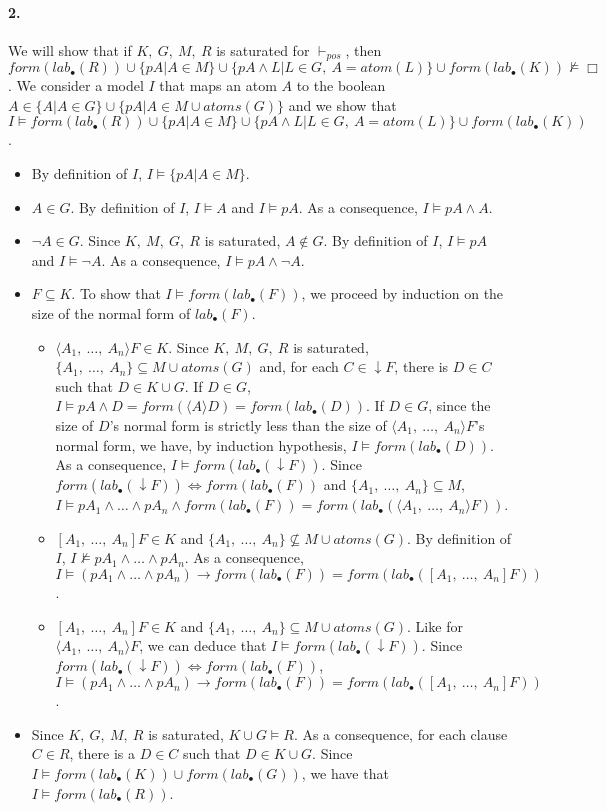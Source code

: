 \documentclass[a4paper,10pt]{article}
\newcommand{\atoms}{\mathit{atoms}}
\newcommand{\atom}{\mathit{atom}}
\newcommand{\pos}{\vdash_\mathit{pos}}
\newcommand{\F}{\mathit{form}}
\newcommand{\T}{\mathit{lab}}
\begin{document}
\paragraph{2.}
We will show that if $K,\ G,\ M,\ R$ is saturated for $\pos$, then
$\F(\T_\bullet(R))\cup\{pA|A\in M\}\cup\{pA\wedge L|L\in G,\ A=\atom(L)\}\cup
\F(\T_\bullet(K))\nvDash\Box$.
We consider a model $I$ that maps an atom $A$ to the boolean
$A\in\{A|A\in G\}\cup\{pA|A\in M\cup\atoms(G)\}$
and we show that $I\vDash\F(\T_\bullet(R))\cup\{pA|A\in M\}\cup\{pA\wedge L|L\in G,\ A=\atom(L)\}\cup
\F(\T_\bullet(K))$.
\begin{itemize}
 \item By definition of $I$, $I\vDash\{pA|A\in M\}$.
 \item $A\in G$. By definition of $I$, $I\vDash A$ and $I\vDash pA$. As a consequence, 
$I\vDash pA\wedge A$.
 \item $\neg A\in G$. Since $K,\ M,\ G,\ R$ is saturated, $A\notin G$. By definition of $I$,
$I\vDash pA$ and $I\vDash\neg A$. As a consequence, $I\vDash pA\wedge\neg A$.
 \item $F\subseteq K$. To show that $I\vDash\F(\T_\bullet(F))$, we proceed by induction on
the size of the normal form of $\T_\bullet(F)$.
\begin{itemize}
 \item $\langle A_1,\ \dots,\ A_n\rangle F\in K$. Since $K,\ M,\ G,\ R$ is saturated,
$\{A_1,\ \dots,\ A_n\}\subseteq M\cup\atoms(G)$ and, for each $C\in\downarrow F$, there is $D\in C$
such that $D\in K\cup G$. If $D\in G$, $I\vDash pA\wedge D=\F(\langle A\rangle D)=\F(\T_\bullet(D))$.
If $D\in G$, since the size of $D$'s normal form is strictly less than the size of
$\langle A_1,\ \dots,\ A_n\rangle F$'s normal form, we have, by induction hypothesis, 
$I\vDash\F(\T_\bullet(D))$. As a consequence, $I\vDash \F(\T_\bullet(\downarrow F))$.
Since $\F(\T_\bullet(\downarrow F))\Leftrightarrow\F(\T_\bullet(F))$ and 
$\{A_1,\ \dots,\ A_n\}\subseteq M$, $I\vDash pA_1\wedge\dots\wedge pA_n\wedge\F(\T_\bullet(F))=
\F(\T_\bullet(\langle A_1,\ \dots,\ A_n\rangle F))$.
 \item $[A_1,\ \dots,\ A_n]F\in K$ and $\{A_1,\ \dots,\ A_n\}\nsubseteq M\cup\atoms(G)$. 
By definition of $I$, $I\nvDash pA_1\wedge\dots\wedge pA_n$. As a consequence, $I\vDash(pA_1\wedge\dots\wedge pA_n)\rightarrow \F(\T_\bullet(F))=\F(\T_\bullet([A_1,\ \dots,\ A_n]F))$.
 \item $[A_1,\ \dots,\ A_n]F\in K$ and $\{A_1,\ \dots,\ A_n\}\subseteq M\cup\atoms(G)$.
Like for $\langle A_1,\ \dots,\ A_n\rangle F$, we can deduce that
$I\vDash\F(\T_\bullet(\downarrow F))$.
Since $\F(\T_\bullet(\downarrow F))\Leftrightarrow\F(\T_\bullet(F))$,
$I\vDash(pA_1\wedge\dots\wedge pA_n)\rightarrow \F(\T_\bullet(F))=\F(\T_\bullet([A_1,\ \dots,\ A_n]F))$.
\end{itemize}
\item Since $K,\ G,\ M,\ R$ is saturated, $K\cup G\vDash R$. As a consequence, for each clause $C\in R$,
there is a $D\in C$ such that $D\in K\cup G$. Since $I\vDash\F(\T_\bullet(K))\cup\F(\T_\bullet(G))$,
we have that $I\vDash\F(\T_\bullet(R))$.
\end{itemize}
\end{document}
